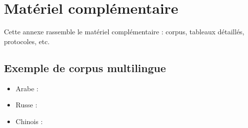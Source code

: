 \chapter{Matériel complémentaire}
\label{annexe:A}

Cette annexe rassemble le matériel complémentaire : corpus, tableaux
détaillés, protocoles, etc.

\section{Exemple de corpus multilingue}

\begin{itemize}
  \item Arabe : 
  \item Russe : 
  \item Chinois : 
\end{itemize}
